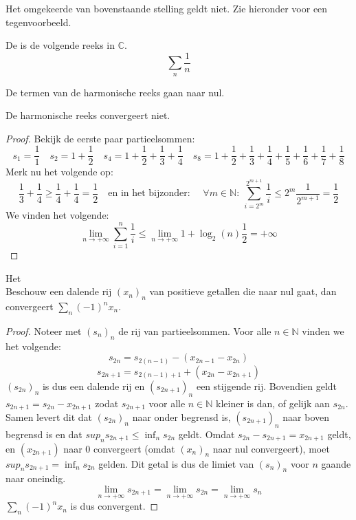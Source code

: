 \documentclass[main.tex]{subfiles}
\begin{document}
\begin{tvb}
  Het omgekeerde van bovenstaande stelling geldt niet.
  Zie hieronder voor een tegenvoorbeeld.
\end{tvb}

\begin{de}
  De  is de volgende reeks in $\mathbb{C}$.
  \[ \sum_{n}\frac{1}{n} \]
\end{de}

\begin{st}
  \label{st:termen-harmonische-reeks-naar-nul}
  De termen van de harmonische reeks gaan naar nul.
\end{st}

\begin{st}
  De harmonische reeks convergeert niet.

  \begin{proof}
    Bekijk de eerste paar partieelsommen:
    \[
    s_{1} = \frac{1}{1}\quad
    s_{2} = 1 + \frac{1}{2}\quad
    s_{4} = 1 + \frac{1}{2} + \frac{1}{3} + \frac{1}{4}\quad
    s_{8} = 1 + \frac{1}{2} + \frac{1}{3} + \frac{1}{4} + \frac{1}{5} + \frac{1}{6} + \frac{1}{7} + \frac{1}{8}
    \]
    Merk nu het volgende op:
    \[ \frac{1}{3} + \frac{1}{4} \ge \frac{1}{4} + \frac{1}{4} = \frac{1}{2} \quad\text{en in het bijzonder: }\quad \forall m\in \mathbb{N}:\ \sum_{i=2^{m}}^{2^{m+1}}\frac{1}{i} \le 2^{m}\frac{1}{2^{m+1}} = \frac{1}{2} \]
    We vinden het volgende:
    \[ \lim_{n\rightarrow +\infty}\sum_{i=1}^{n}\frac{1}{i} \le \lim_{n\rightarrow +\infty} 1+ \log_{2}(n)\frac{1}{2} = +\infty \]
\feed
  \end{proof}
\end{st}

\begin{st}
  \label{st:criterium-leibniz}
  Het \\
  Beschouw een dalende rij $(x_{n})_{n}$ van positieve getallen die naar nul gaat, dan convergeert $\sum_{n}(-1)^{n}x_{n}$.

  \begin{proof}
    Noteer met $(s_{n})_{n}$ de rij van partieelsommen.
    Voor alle $n\in \mathbb{N}$ vinden we het volgende:
    \[ s_{2n} = s_{2(n-1)} - (x_{2n-1}-x_{2n}) \]
    \[ s_{2n+1} = s_{2(n-1)+1} + (x_{2n}-x_{2n+1}) \]
    $(s_{2n})_{n}$ is dus een dalende rij en $(s_{2n+1})_{n}$ een stijgende rij.
    Bovendien geldt $s_{2n+1} = s_{2n}-x_{2n+1}$ zodat $s_{2n+1}$ voor alle $n\in \mathbb{N}$ kleiner is dan, of gelijk aan $s_{2n}$.
    Samen levert dit dat $(s_{2n})_{n}$ naar onder begrensd is, $(s_{2n+1})_{n}$ naar boven begrensd is en dat $sup_{n}s_{2n+1} \le \inf_{n}s_{2n}$ geldt.
    Omdat $s_{2n}-s_{2n+1} = x_{2n+1}$ geldt, en $(x_{2n+1})$ naar $0$ convergeert (omdat $(x_{n})_{n}$ naar nul convergeert), moet $sup_{n}s_{2n+1} = \inf_{n}s_{2n}$ gelden.
    Dit getal is dus de limiet van $(s_{n})_{n}$ voor $n$ gaande naar oneindig.
    \[ \lim_{n \rightarrow +\infty}s_{2n+1} = \lim_{n \rightarrow +\infty}s_{2n} = \lim_{n \rightarrow +\infty}s_{n} \]
    $\sum_{n}(-1)^{n}x_{n}$ is dus convergent.
  \end{proof}
\end{st}
\end{document}
